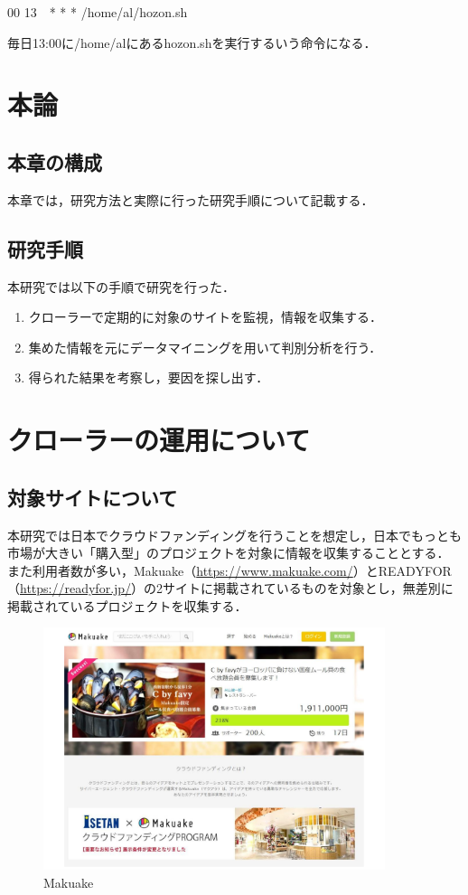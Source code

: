 00 13　* * * /home/al/hozon.sh   

毎日13:00に/home/alにあるhozon.shを実行するいう命令になる．

\chapter{本論}

\section{本章の構成}
本章では，研究方法と実際に行った研究手順について記載する．

\section{研究手順}
本研究では以下の手順で研究を行った．
\begin{enumerate}
 \item クローラーで定期的に対象のサイトを監視，情報を収集する．
 \item 集めた情報を元にデータマイニングを用いて判別分析を行う．
 \item 得られた結果を考察し，要因を探し出す．
\end{enumerate}

\chapter{クローラーの運用について}

\section{対象サイトについて}
本研究では日本でクラウドファンディングを行うことを想定し，日本でもっとも市場が大きい「購入型」のプロジェクトを対象に情報を収集することとする．
また利用者数が多い，Makuake（\url{https://www.makuake.com/}）とREADYFOR（\url{https://readyfor.jp/}）の2サイトに掲載されているものを対象とし，無差別に掲載されているプロジェクトを収集する．
\begin{figure}[H]
\centering
\includegraphics[width=10cm]{figure16.pdf}
\caption{Makuake}\label{sannp}
\end{figure}

